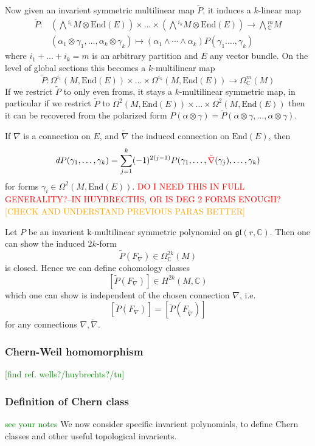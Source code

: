 \documentclass[a4paper]{article}
\theoremstyle{definition} \newtheorem*{definition}{Definition}
\theoremstyle{definition} \newtheorem*{definitions}{Definitions}
\theoremstyle{plain} \newtheorem{theorem}{Theorem}[section]
\theoremstyle{plain} \newtheorem{proposition}[theorem]{Proposition}
\theoremstyle{plain} \newtheorem{corollary}[theorem]{Corollary}
\theoremstyle{plain} \newtheorem{lemma}[theorem]{Lemma}
\theoremstyle{plain} \newtheorem{example}[theorem]{Example}
\newcommand{\checkCorrect}[1]{\textcolor{red}{#1}}
\newcommand{\understandBetter}[1]{\textcolor{orange}{#1}}
\newcommand{\finish}[1]{\textcolor{green}{#1}}
\newcommand{\complexnos}{\mathbb{C}}
\newcommand{\End}{\text{End}}
\begin{document}
Now given an invarient symmetric multilinear map $\tilde{P}$, it induces a $k$-linear map
\begin{align*}
    \tilde{P} : & \left( \bigwedge {}^{i_1}M\otimes \End(E) \right) \times \ldots \times \left( \bigwedge {}^{i_k}M\otimes \End(E) \right)  \to \bigwedge {}^m_\complexnos M \\
    & (\alpha_1\otimes \gamma_1, \ldots, \alpha_k\otimes \gamma_k) \mapsto (\alpha_1\wedge \cdots \wedge \alpha_k)P(\gamma_1. \ldots, \gamma_k)
\end{align*}
where $i_1+\ldots +i_k=m$ is an arbitrary partition and $E$ any vector bundle. On the level of global sections this becomes a $k$-multilinear map 
$$\tilde{P}:\Omega^{i_1}(M, \End(E))\times \ldots \times \Omega^{i_k}(M, \End(E))\to \Omega^m_\complexnos(M)$$
If we restrict $\tilde{P}$ to only even froms, it stays a $k$-multilinear symmetric map, in particular if we restrict $\tilde{P}$ to $\Omega^{2}(M, \End(E))\times \ldots \times \Omega^{2}(M, \End(E))$
then it can be recovered from the polarized form $P(\alpha\otimes \gamma)=\tilde{P}(\alpha\otimes\gamma, \ldots, \alpha\otimes\gamma)$.

If $\nabla$ is a connection on $E$, and $\tilde{\nabla}$ the induced connection on $\End(E)$, then 
$$dP(\gamma_1, \ldots, \gamma_k)=\sum_{j=1}^k (-1)^{2(j-1)}P(\gamma_1, \ldots, \checkCorrect{\tilde{\nabla}}(\gamma_j), \ldots, \gamma_k)$$
for forms $\gamma_i\in \Omega^2(M, \End(E))$. \checkCorrect{DO I NEED THIS IN FULL GENERALITY?--IN HUYBRECTHS, OR IS DEG 2 FORMS ENOUGH?}
\understandBetter{[CHECK AND UNDERSTAND PREVIOUS PARAS BETTER]}


Let $P$ be an invarient k-multilinear symmetric polynomial on $\mathfrak{gl}(r, \complexnos)$. Then one can show the induced $2k$-form 
$$\tilde{P}(F_\nabla)\in \Omega^{2k}_\complexnos(M)$$
is closed. Hence we can define cohomology classes
$$[\tilde{P}(F_\nabla)]\in H^{2k}(M, \complexnos)$$
which one can show is independent of the chosen connection $\nabla$, i.e.
$$[\tilde{P}(F_\nabla)]=[\tilde{P}(F_{\tilde{\nabla}} )]$$
for any connections $\nabla, \tilde{\nabla}$. 

\subsubsection{Chern-Weil homomorphism}
\finish{[find ref. wells?/huybrechts?/tu]}


\subsubsection{Definition of Chern class}
\finish{see your notes}
We now consider specific invarient polynomials, to define Chern classes and other useful topological invarients. 
\end{document}
